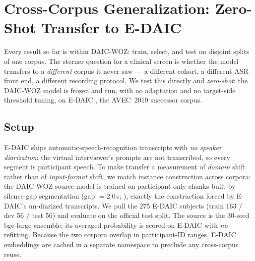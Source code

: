 \section{Cross-Corpus Generalization: Zero-Shot Transfer to E-DAIC}
\label{sec:edaic}

Every result so far is within DAIC-WOZ: train, select, and test on disjoint
splits of one corpus. The sterner question for a clinical screen is whether the
model transfers to a \emph{different} corpus it never saw --- a different cohort,
a different ASR front end, a different recording protocol. We test this directly
and \emph{zero-shot}: the DAIC-WOZ model is frozen and run, with no adaptation
and no target-side threshold tuning, on E-DAIC \cite{ringeval2019avec}, the
AVEC~2019 successor corpus.

\subsection{Setup}
\label{sec:edaic-setup}
E-DAIC ships automatic-speech-recognition transcripts with \emph{no speaker
diarization}: the virtual interviewer's prompts are not transcribed, so every
segment is participant speech. To make transfer a measurement of \emph{domain}
shift rather than of \emph{input-format} shift, we match instance construction
across corpora: the DAIC-WOZ source model is trained on participant-only chunks
built by silence-gap segmentation (gap $=2.0$\,s; ), exactly the
construction forced by E-DAIC's un-diarized transcripts. We pull the 275 E-DAIC
subjects (train 163 / dev 56 / test 56) and evaluate on the official test split.
The source is the 30-seed bge-large ensemble; its averaged probability is scored
on E-DAIC with \emph{no} refitting. Because the two corpora overlap in
participant-ID ranges, E-DAIC embeddings are cached in a separate namespace to
preclude any cross-corpus reuse.

